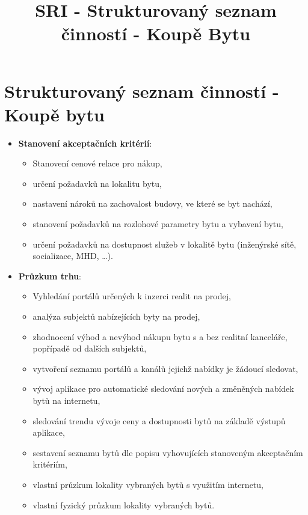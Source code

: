 \documentclass[a4paper,10pt]{article}
\title{SRI - Strukturovaný seznam činností - Koupě Bytu}
\begin{document}
\thispagestyle{empty}
\section*{Strukturovaný seznam činností - Koupě bytu}
\begin{itemize}
	\setlength{\itemsep}{3pt}
	
	\item \textbf{Stanovení akceptačních kritérií}:
		\begin{itemize}
			\item Stanovení cenové relace pro nákup, 
			\item určení požadavků na lokalitu bytu,
			\item nastavení nároků na zachovalost budovy, ve které se byt nachází, 
			\item stanovení požadavků na rozlohové parametry bytu a vybavení bytu, 
			\item určení požadavků na dostupnost služeb v lokalitě bytu (inženýrské sítě, socializace, MHD, \dots{}).
		\end{itemize}
	
	\item \textbf{Průzkum trhu}:
		\begin{itemize}
			\item Vyhledání portálů určených k inzerci realit na prodej,
			\item analýza subjektů nabízejících byty na prodej,
			\item zhodnocení výhod a nevýhod nákupu bytu s a bez realitní kanceláře, popřípadě od dalších subjektů,
			\item vytvoření seznamu portálů a kanálů jejichž nabídky je žádoucí sledovat,
			\item vývoj aplikace pro automatické sledování nových a změněných nabídek bytů na internetu,
			\item sledování trendu vývoje ceny a dostupnosti bytů na základě výstupů aplikace,
			\item sestavení seznamu bytů dle popisu vyhovujících stanoveným akceptačním kritériím,
			\item vlastní průzkum lokality vybraných bytů s využitím internetu,
			\item vlastní fyzický průzkum lokality vybraných bytů. 
		\end{itemize}
	

\end{itemize}
\end{document}
